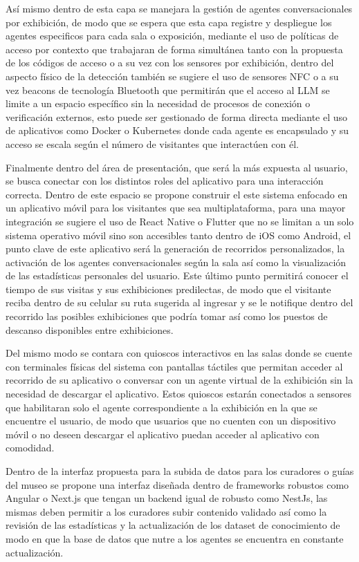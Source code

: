 \documentclass[pdflatex,sn-mathphys-num]{sn-jnl}%
\theoremstyle{thmstyleone}%
\theoremstyle{thmstyletwo}%
\theoremstyle{thmstylethree}%
\begin{document}
Así mismo dentro de esta capa se manejara la gestión de agentes conversacionales por exhibición, de modo que se espera que esta capa registre y despliegue los agentes especificos para cada sala o exposición, mediante el uso de políticas de acceso por contexto que trabajaran de forma simultánea tanto con la propuesta de los códigos de acceso o a su vez con los sensores por exhibición, dentro del aspecto físico de la detección también se sugiere el uso de sensores NFC o a su vez beacons de tecnología Bluetooth que permitirán que el acceso al LLM se limite a un espacio específico sin la necesidad de procesos de conexión o verificación externos, esto puede ser gestionado de forma directa mediante el uso de aplicativos como Docker o Kubernetes donde cada agente es encapsulado y su acceso se escala según el número de visitantes que interactúen con él.

Finalmente dentro del área de presentación, que será la más expuesta al usuario, se busca conectar con los distintos roles del aplicativo para una interacción correcta. Dentro de este espacio se propone construir el este sistema enfocado en un aplicativo móvil para los visitantes que sea multiplataforma, para una mayor integración se sugiere el uso de React Native o Flutter que no se limitan a un solo sistema operativo móvil sino son accesibles tanto dentro de iOS como Android, el punto clave de este aplicativo será la generación de recorridos personalizados, la activación de los agentes conversacionales según la sala así como la visualización de las estadísticas personales del usuario. Este último punto permitirá conocer el tiempo de sus visitas y sus exhibiciones predilectas, de modo que el visitante reciba dentro de su celular su ruta sugerida al ingresar y se le notifique dentro del recorrido las posibles exhibiciones que podría tomar así como los puestos de descanso disponibles entre exhibiciones.

Del mismo modo se contara con quioscos interactivos en las salas donde se cuente con terminales físicas del sistema con pantallas táctiles que permitan acceder al recorrido de su aplicativo o conversar con un agente virtual de la exhibición sin la necesidad de descargar el aplicativo. Estos quioscos estarán conectados a sensores que habilitaran solo el agente correspondiente a la exhibición en la que se encuentre el usuario, de modo que usuarios que no cuenten con un dispositivo móvil o no deseen descargar el aplicativo puedan acceder al aplicativo con comodidad.

Dentro de la interfaz propuesta para la subida de datos para los curadores o guías del museo se propone una interfaz diseñada dentro de frameworks robustos como Angular o Next.js que tengan un backend igual de robusto como NestJs, las mismas deben permitir a los curadores subir contenido validado así como la revisión de las estadísticas y la actualización de los dataset de conocimiento de modo en que la base de datos que nutre a los agentes se encuentra en constante actualización.
\end{document}
